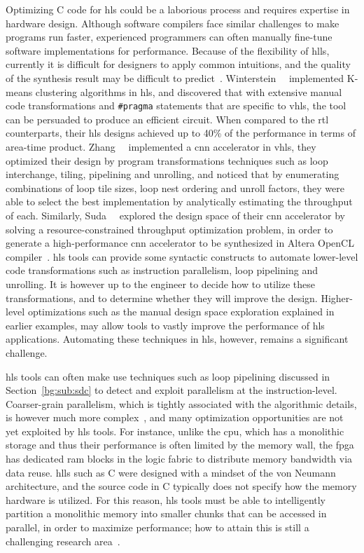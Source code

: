 Optimizing C code for \gls{hls} could be a laborious process and requires
expertise in hardware design.  Although software compilers face similar
challenges to make programs run faster, experienced programmers can often
manually fine-tune software implementations for performance.  Because of
the flexibility of \glspl{hll}, currently it is difficult for designers
to apply common intuitions, and the quality of the synthesis result may
be difficult to predict~\cite{gupta04}.  Winterstein~\etal~\cite{felix13}
implemented K-means clustering algorithms in \gls{hls}, and discovered that
with extensive manual code transformations and \verb|#pragma| statements
that are specific to \gls{vhls}, the tool can be persuaded to produce an
efficient circuit.  When compared to the \gls{rtl} counterparts, their
\gls{hls} designs achieved up to 40\% of the performance in terms of area-time
product.  Zhang~\etal~\cite{zhang15} implemented a \gls{cnn} accelerator in
\gls{vhls}, they optimized their design by program transformations techniques
such as loop interchange, tiling, pipelining and unrolling, and noticed that
by enumerating combinations of loop tile sizes, loop nest ordering and unroll
factors, they were able to select the best implementation by analytically
estimating the throughput of each.  Similarly, Suda~\etal~\cite{suda16}
explored the design space of their \gls{cnn} accelerator by solving a
resource-constrained throughput optimization problem, in order to generate
a high-performance \gls{cnn} accelerator to be synthesized in Altera OpenCL
compiler~\cite{aoc}.  \Gls{hls} tools can provide some syntactic constructs
to automate lower-level code transformations such as instruction parallelism,
loop pipelining and unrolling.  It is however up to the engineer to decide how
to utilize these transformations, and to determine whether they will improve
the design.  Higher-level optimizations such as the manual design space
exploration explained in earlier examples, may allow tools to vastly improve
the performance of \gls{hls} applications.  Automating these techniques in
\gls{hls}, however, remains a significant challenge.

\Gls{hls} tools can often make use techniques such as loop pipelining
discussed in Section~\ref{bg:sub:sdc} to detect and exploit parallelism at the
instruction-level.  Coarser-grain parallelism, which is tightly associated
with the algorithmic details, is however much more complex~\cite{nane15}, and
many optimization opportunities are not yet exploited by \gls{hls} tools.  For
instance, unlike the \gls{cpu}, which has a monolithic storage and thus their
performance is often limited by the memory wall, the \gls{fpga} has dedicated
\gls{ram} blocks in the logic fabric to distribute memory bandwidth via data
reuse. \glspl{hll} such as C were designed with a mindset of the von Neumann
architecture, and the source code in C typically does not specify how the
memory hardware is utilized.  For this reason, \gls{hls} tools must be able to
intelligently partition a monolithic memory into smaller chunks that can be
accessed in parallel, in order to maximize performance; how to attain this is
still a challenging research area~\cite{cong11, cong12, wang13, felix15}.

